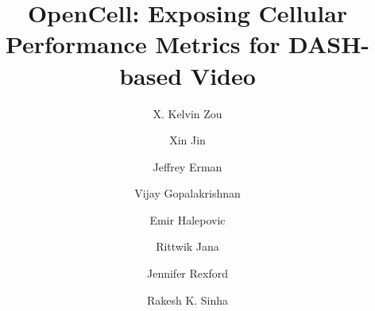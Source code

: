 \documentclass{sig-alternate-10pt}
\begin{document}
\title{OpenCell: Exposing Cellular Performance Metrics for DASH-based Video}
\author[1]{\large X. Kelvin Zou}
\author[1]{\large Xin Jin}
\author[2]{\large Jeffrey Erman}
\author[2]{\large Vijay Gopalakrishnan}
\author[2]{\large Emir Halepovic}
\author[2]{\large Rittwik Jana}
\author[1]{\large Jennifer Rexford}
\author[2]{\large Rakesh K. Sinha}
 
 


\maketitle







 

 

{\small
} 
\end{document}

